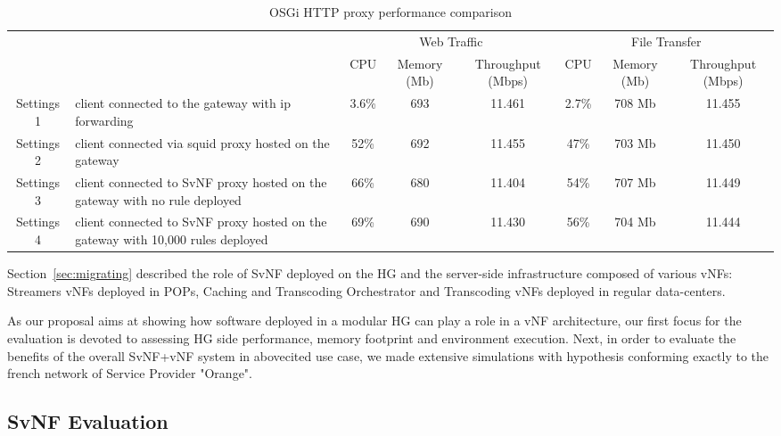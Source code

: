 \begin{table}
	\centering
	\begin{tabular}{| c | p{}|c |c |c || c |c |c |}
	
	
 	    \multicolumn{2}{c}{} & \multicolumn{3}{c}{Web Traffic} 		  & \multicolumn{3}{c}{File Transfer} \\
 	     \cline{3-8}	
             \multicolumn{2}{c|}{} & CPU 			& Memory (Mb) 		& Throughput (Mbps)	& CPU 		& Memory (Mb)		& Throughput (Mbps) \\\hline   
Settings 1 & client connected to the gateway with ip forwarding &   3.6\% 		& 693 		& 11.461		& 2.7\%		& 708 Mb		& 11.455 \\\hline
Settings 2 & client connected via squid proxy hosted on the gateway   &   52\%        & 692 		& 11.455		& 47\%		& 703 Mb		& 11.450 \\\hline
Settings 3 & client connected to SvNF proxy hosted on the gateway with no rule deployed &   66\%		& 680 		& 11.404		& 54\%		& 707 Mb		& 11.449 \\\hline
Settings 4 & client connected to SvNF proxy hosted on the gateway with 10,000 rules deployed   &   69\%        & 690 		& 11.430		& 56\%		& 704 Mb		& 11.444 \\\hline
	
	            
	\end{tabular}
	\caption{
	OSGi HTTP proxy performance comparison
	\label{tab:perf-comparison}
	}
	
\end{table}

Section~\ref{sec:migrating} described the role of SvNF deployed on the HG and the server-side infrastructure composed of various vNFs: Streamers vNFs deployed in POPs, Caching and Transcoding Orchestrator and Transcoding vNFs deployed in regular data-centers. 

As our proposal aims at showing how software deployed in a modular HG can play a role in a vNF architecture, our first focus for the evaluation is devoted to assessing HG side performance, memory footprint and environment execution.
Next, in order to evaluate the benefits of the overall SvNF+vNF system in abovecited use case, we made extensive simulations with hypothesis conforming exactly to the french network of Service Provider "Orange".

\subsection{SvNF Evaluation }\label{Testbed}

